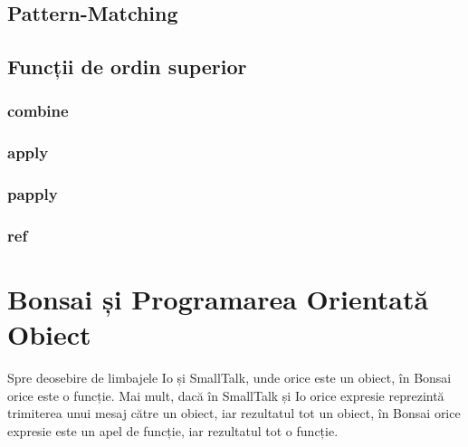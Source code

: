 \documentclass[12pt,a4paper]{memoir}
\begin{document}
\section{Pattern-Matching}

\section{}


\section{Funcții de ordin superior}

\subsection{combine}

\subsection{apply}

\subsection{papply}

\subsection{ref}

\chapter{Bonsai și Programarea Orientată Obiect}

Spre deosebire de limbajele Io\cite{io} și SmallTalk\cite{smalltalk}, unde orice este un obiect, în Bonsai orice este o funcție. Mai mult, dacă în SmallTalk și Io orice expresie reprezintă trimiterea unui mesaj către un obiect, iar rezultatul tot un obiect, în Bonsai orice expresie este un apel de funcție, iar rezultatul tot o funcție.
\end{document}

